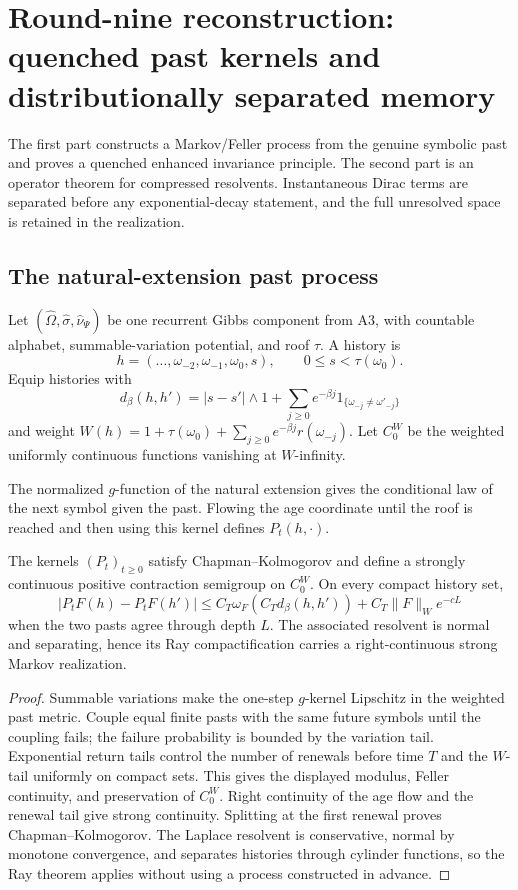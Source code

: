 \section{Round-nine reconstruction: quenched past kernels and distributionally separated memory}
\label{sec:r9-a4}

The first part constructs a Markov/Feller process from the genuine symbolic
past and proves a quenched enhanced invariance principle.  The second part is
an operator theorem for compressed resolvents.  Instantaneous Dirac terms are
separated before any exponential-decay statement, and the full unresolved
space is retained in the realization.

\subsection{The natural-extension past process}

Let $(\widehat\Omega,\widehat\sigma,\widehat\nu_\Psi)$ be one recurrent Gibbs
component from A3, with countable alphabet, summable-variation potential, and
roof $\tau$.  A history is
\[
 h=(\ldots,\omega_{-2},\omega_{-1},\omega_0,s),
 \qquad 0\le s<\tau(\omega_0).
\]
Equip histories with
\[
 d_\beta(h,h')=|s-s'|\wedge1+
 \sum_{j\ge0}e^{-\beta j}1_{\{\omega_{-j}\ne\omega'_{-j}\}}
\]
and weight $W(h)=1+\tau(\omega_0)+\sum_{j\ge0}e^{-\beta j}r(\omega_{-j})$.
Let $C_0^W$ be the weighted uniformly continuous functions vanishing at
$W$-infinity.

The normalized $g$-function of the natural extension gives the conditional
law of the next symbol given the past.  Flowing the age coordinate until the
roof is reached and then using this kernel defines $P_t(h,\cdot)$.

\begin{theorem}
\label{thm:r9-a4-feller}
The kernels $(P_t)_{t\ge0}$ satisfy Chapman--Kolmogorov and define a strongly
continuous positive contraction semigroup on $C_0^W$.  On every compact
history set,
\[
 |P_tF(h)-P_tF(h')|
 \le C_T\omega_F(C_Td_\beta(h,h'))+C_T\|F\|_W e^{-cL}
\]
when the two pasts agree through depth $L$.  The associated resolvent is
normal and separating, hence its Ray compactification carries a
right-continuous strong Markov realization.
\end{theorem}

\begin{proof}
Summable variations make the one-step $g$-kernel Lipschitz in the weighted past
metric.  Couple equal finite pasts with the same future symbols until the
coupling fails; the failure probability is bounded by the variation tail.
Exponential return tails control the number of renewals before time $T$ and
the $W$-tail uniformly on compact sets.  This gives the displayed modulus,
Feller continuity, and preservation of $C_0^W$.  Right continuity of the age
flow and the renewal tail give strong continuity.  Splitting at the first
renewal proves Chapman--Kolmogorov.  The Laplace resolvent is conservative,
normal by monotone convergence, and separates histories through cylinder
functions, so the Ray theorem applies without using a process constructed in
advance.
\end{proof}


